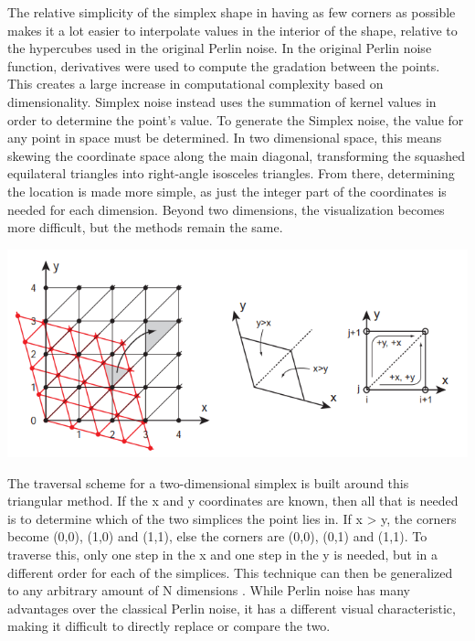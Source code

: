 \documentclass[10pt]{report}
\begin{document}
		The relative simplicity of the simplex shape in having as few corners as possible makes it a lot easier to interpolate values in the interior of the shape, relative to the hypercubes used in the original Perlin noise.
		In the original Perlin noise function, derivatives were used to compute the gradation between the points. This creates a large increase in computational complexity based on dimensionality. Simplex noise instead uses the summation of kernel values in order to determine the point's value. To generate the Simplex noise, the value for any point in space must be determined. In two dimensional space, this means skewing the coordinate space along the main diagonal, transforming the squashed equilateral triangles into right-angle isosceles triangles. From there, determining the location is made more simple, as just the integer part of the coordinates is needed for each dimension. Beyond two dimensions, the visualization becomes more difficult, but the methods remain the same.  
		
		\begin{minipage}{\textwidth}
			\centering
			\includegraphics[scale=.5]{skewed grid}
			\label{fig:fig3}
		\end{minipage}
		
		The traversal scheme for a two-dimensional simplex is built around this triangular method. If the x and y coordinates are known, then all that is needed is to determine which of the two simplices the point lies in. If x > y, the corners become (0,0), (1,0) and (1,1), else the corners are (0,0), (0,1) and (1,1). To traverse this, only one step in the x and one step in the y is needed, but in a different order for each of the simplices. This technique can then be generalized to any arbitrary amount of N dimensions \cite{simplex-demyst}. While Perlin noise has many advantages over the classical Perlin noise, it has a different visual characteristic, making it difficult to directly replace or compare the two. 
		
\end{document}
